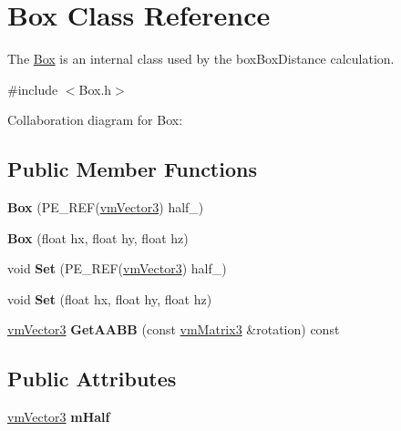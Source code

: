 \hypertarget{class_box}{\section{Box Class Reference}
\label{class_box}
}


The \hyperlink{class_box}{Box} is an internal class used by the box\+Box\+Distance calculation.  




{\ttfamily \#include $<$Box.\+h$>$}



Collaboration diagram for Box\+:
\subsection*{Public Member Functions}
\begin{DoxyCompactItemize}
\item 
\hypertarget{class_box_a8f606a53b630a558df77203b8ee28a6c}{{\bfseries Box} (P\+E\+\_\+\+R\+E\+F(\hyperlink{class_vectormath_1_1_aos_1_1_vector3}{vm\+Vector3}) half\+\_\+)}\label{class_box_a8f606a53b630a558df77203b8ee28a6c}

\item 
\hypertarget{class_box_a22a2eee699427db13ac222dfb41cc9f7}{{\bfseries Box} (float hx, float hy, float hz)}\label{class_box_a22a2eee699427db13ac222dfb41cc9f7}

\item 
\hypertarget{class_box_abb7f916da81c66b7a83f6d9640919796}{void {\bfseries Set} (P\+E\+\_\+\+R\+E\+F(\hyperlink{class_vectormath_1_1_aos_1_1_vector3}{vm\+Vector3}) half\+\_\+)}\label{class_box_abb7f916da81c66b7a83f6d9640919796}

\item 
\hypertarget{class_box_abd360679ca42db8fe4870de4b354b155}{void {\bfseries Set} (float hx, float hy, float hz)}\label{class_box_abd360679ca42db8fe4870de4b354b155}

\item 
\hypertarget{class_box_ae499e165c6f8057dee10cc1a8065d64c}{\hyperlink{class_vectormath_1_1_aos_1_1_vector3}{vm\+Vector3} {\bfseries Get\+A\+A\+B\+B} (const \hyperlink{class_vectormath_1_1_aos_1_1_matrix3}{vm\+Matrix3} \&rotation) const }\label{class_box_ae499e165c6f8057dee10cc1a8065d64c}

\end{DoxyCompactItemize}
\subsection*{Public Attributes}
\begin{DoxyCompactItemize}
\item 
\hypertarget{class_box_ab161b57313f5d40ab011c6e6f8e01171}{\hyperlink{class_vectormath_1_1_aos_1_1_vector3}{vm\+Vector3} {\bfseries m\+Half}}\label{class_box_ab161b57313f5d40ab011c6e6f8e01171}

\end{DoxyCompactItemize}



